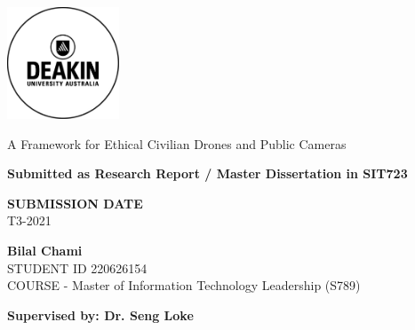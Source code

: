 \documentclass[12pt]{article}
\begin{document}
\onehalfspacing
\thispagestyle{empty} 
\begin{titlepage}
    \includegraphics[width=0.25\textwidth]{Deakin_Logo.jpeg}
    \begin{center}
       \vspace*{4cm}
       {\LARGE A Framework for 
         \newline
       Ethical Civilian Drones and Public Cameras} %
       \vspace{3cm}
    \begin{large}   
    
        
        {\bf Submitted as Research Report  / Master Dissertation in SIT723}
       \vspace{1cm}
        
        {\bf SUBMISSION DATE} \\
        T3-2021        
        
       \vspace{3cm}
\textbf{Bilal Chami}\\
       STUDENT ID 220626154 \\
       COURSE - Master of Information Technology Leadership
 (S789)
       \vfill

       {\bf \normalsize Supervised by: Dr. Seng Loke}\\
       
    \end{large}  
   \end{center}
\end{titlepage}

\newpage 
\thispagestyle{plain} 


\newpage
\begin{singlespacing}
\tableofcontents
\end{singlespacing}
\setlength{\parskip}{1em}
\renewcommand{\baselinestretch}{2.0}

\newpage
\listoffigures
\listoftables

\newpage 
{}
\setcounter{page}{1}
\onehalfspacing










\newpage
\singlespacing

\end{document}
